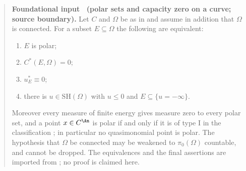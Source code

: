 \label{thm:ch25-thuillier-polar}
\begin{quote}
\textbf{Foundational input \thetheorem\ (polar sets and capacity zero on a
curve; source boundary).}
Let $C$ and $\Omega$ be as in  and
assume in addition that $\Omega$ is connected.  For a subset
$E\subseteq\Omega$ the following are equivalent:
\begin{enumerate}
\item\label{itm:ch25-thupol:polar} $E$ is polar;
\item\label{itm:ch25-thupol:cap} $C^*(E,\Omega)=0$;
\item\label{itm:ch25-thupol:extremal} $u^*_E\equiv0$;
\item\label{itm:ch25-thupol:single} there is $u\in\mathrm{SH}(\Omega)$ with
 $u\leq0$ and $E\subseteq\{u=-\infty\}$.
\end{enumerate}
Moreover every measure of finite energy gives measure zero to every polar
set, and a point $x\in C^{\An}$ is polar if and only if it is of type
$\mathrm{I}$ in the classification ; in
particular no quasimonomial point is polar.  The hypothesis that
$\Omega$ be connected may be weakened to $\pi_0(\Omega)$ countable, and
cannot be dropped.
The equivalences and the final assertions are imported from
\cite[Th\'eor\`eme~3.5.11, Proposition~3.4.10 and
Th\'eor\`eme~3.6.11]{Thu05}; no proof is claimed here.
\end{quote}

